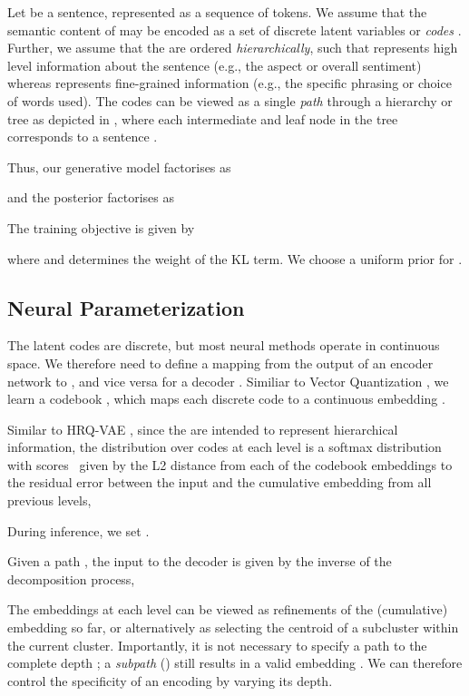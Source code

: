 \documentclass[11pt]{article}
\begin{document}
Let  be a sentence, represented as a sequence of tokens. We assume that the semantic content of  may be encoded as a set of discrete latent variables or \textit{codes} . Further, we assume that the  are ordered \textit{hierarchically}, such that  represents high level information about the sentence (e.g., the aspect or overall sentiment) whereas  represents fine-grained information (e.g., the specific phrasing or choice of words used). The codes  can be viewed as a single \textit{path} through a hierarchy or tree as depicted in , where each intermediate and leaf node in the tree corresponds to a sentence .








Thus, our generative model factorises as

and the posterior factorises as
\vspace{-.2cm}


The training objective is given by

where  and  determines the weight of the KL term. We choose a uniform prior for .



\subsection{Neural Parameterization}

The latent codes  are discrete, but most neural methods operate in continuous space. We therefore need to define a mapping from the output  of an encoder network  to , and vice versa for a decoder . Similiar to Vector Quantization \cite[VQ,][]{vqvae}, we learn a codebook , which maps each discrete code to a continuous embedding .

 Similar to HRQ-VAE \cite{hosking-etal-2022-hierarchical}, since the  are intended to represent hierarchical information, the distribution over codes at each level is a softmax distribution with scores~ given by the L2 distance from each of the codebook embeddings to the residual error between the input and the cumulative embedding from all previous levels, 

During inference, we set .

Given a path , the input to the decoder  is given by the inverse of the decomposition process,

The embeddings at each level can be viewed as refinements of the (cumulative) embedding so far, or alternatively as selecting the centroid of a subcluster within the current cluster. Importantly, it is not necessary to specify a path to the complete depth ; a \textit{subpath}  () still results in a valid embedding . We can therefore control the specificity of an encoding by varying its depth.
\end{document}
